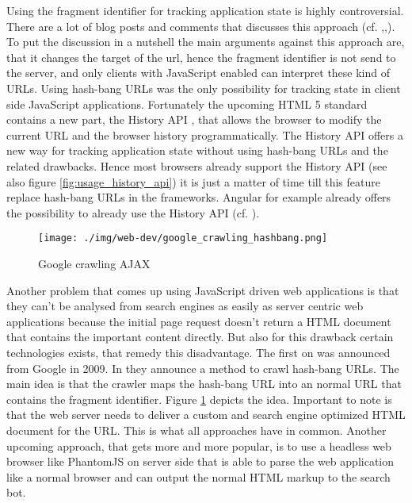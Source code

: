 Using the fragment identifier for tracking application state is highly controversial.
There are a lot of blog posts and comments that discusses this approach (cf.
\autocite[]{hashbang_urls_1},\autocite[]{hashbang_urls_2},\autocite[]{hashbang_urls_3}).
To put the discussion in a nutshell the main arguments against this approach are, that it changes the target of the url, hence the fragment identifier is not send to the server, and only clients with JavaScript enabled can interpret these kind of URLs.
Using hash-bang  URLs was the only possibility for tracking state in client side JavaScript applications.
Fortunately the upcoming HTML 5 standard contains a new part, the History API \autocite[]{w3c-history-api}, that allows the browser to modify the current URL and the browser history programmatically.
The History API offers a new way for tracking application state without using hash-bang URLs and the related drawbacks.
Hence most browsers already support the History API (see also figure \ref{fig:usage_history_api}) it is just a matter of time till this feature replace hash-bang URLs in the frameworks.
Angular for example already offers the possibility to already use the History API (cf.
\autocite[]{angular_location}). 

\begin{figure}
	\centering \texttt{[image: ./img/web-dev/google\_crawling\_hashbang.png]}
	\caption{Google crawling AJAX \autocite{google_AJAX_crawling}}
	\label{fig:google_crawling_ajax}
\end{figure}

Another problem that comes up using JavaScript driven web applications is that they can't be analysed from search engines as easily as server centric web applications because the initial page request doesn't return a HTML document that contains the important content directly.
But also for this drawback certain technologies exists, that remedy this disadvantage.
The first on  was announced from  Google in 2009.
In \autocite[]{google_AJAX_crawling} they announce a method to crawl hash-bang URLs.
The main idea is that the crawler maps the hash-bang URL into an normal URL that contains the fragment identifier.
Figure \ref{fig:google_crawling_ajax} depicts the idea.
Important to note is that the web server needs to deliver a custom and search engine optimized HTML document for the URL.
This is what all approaches have in common.
Another upcoming approach, that gets more and more popular, is to use a headless web browser like PhantomJS on server side that is able to parse the web application like a normal browser and can output the normal HTML markup to the search bot.